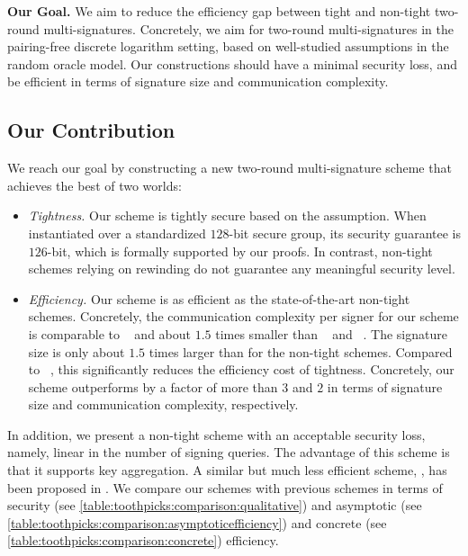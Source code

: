 \documentclass[version=final]{iacrcc}
\theoremstyle{mytheorem}				\newtheorem{theorem}{Theorem}
\theoremstyle{myplain}
\theoremstyle{mydefinition}
\theoremstyle{myremark}
\begin{document}
\smallskip\noindent\textbf{Our Goal.} 
We aim to reduce the efficiency gap between tight and non-tight two-round multi-signatures.
Concretely, we aim for two-round multi-signatures in the pairing-free discrete logarithm setting, based on well-studied assumptions in the random oracle model. Our constructions should have a minimal security loss, and be efficient in terms of signature size and communication complexity. \subsection{Our Contribution}
We reach our goal by constructing a new two-round multi-signature scheme that achieves the best of two worlds:
\begin{itemize}
	\item \emph{Tightness.} Our scheme is tightly secure based on the \ddh assumption.
	When instantiated over a standardized $128$-bit secure group, its security guarantee is $126$-bit, which is formally supported by our proofs. 
  In contrast, non-tight schemes relying on rewinding do not guarantee any meaningful security level.

	\item \emph{Efficiency.} Our scheme is as efficient as the state-of-the-art non-tight schemes.
	Concretely, the communication complexity per signer for our scheme is comparable to \HBMS~\cite{AC:BelDai21} and about $1.5$ times smaller than \TZ~\cite{EC:TesZhu23a} and \MusigTwo~\cite{C:NicRufSeu21}. 
  The signature size is only about $1.5$ times larger than for the non-tight schemes.
	Compared to \ChopsticksTwo~\cite{EC:PanWag23}, this significantly reduces the efficiency cost of tightness. Concretely, our scheme outperforms \ChopsticksTwo by a factor of more than $3$ and $2$ in terms of signature size and communication complexity, respectively.
\end{itemize}
In addition, we present a non-tight scheme with an acceptable security loss, namely, linear in the number of signing queries. 
The advantage of this scheme is that it supports key aggregation.
A similar but much less efficient scheme, \ChopsticksOne, has been proposed in \cite{EC:PanWag23}.
We compare our schemes with previous schemes in terms of security (see \cref{table:toothpicks:comparison:qualitative}) and asymptotic (see \cref{table:toothpicks:comparison:asymptoticefficiency}) and concrete (see \cref{table:toothpicks:comparison:concrete}) efficiency.
\end{document}
